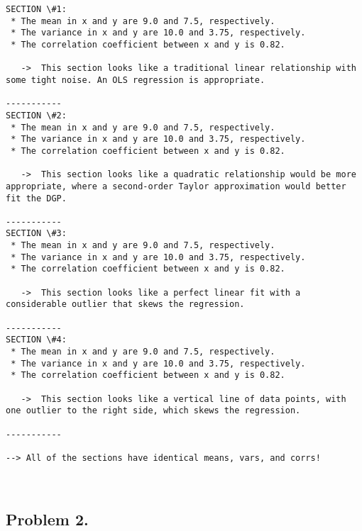 \documentclass[11pt]{article}
\begin{document}
    \begin{Verbatim}[commandchars=\\\{\}]
SECTION \#1:
 * The mean in x and y are 9.0 and 7.5, respectively.
 * The variance in x and y are 10.0 and 3.75, respectively.
 * The correlation coefficient between x and y is 0.82.

   ->  This section looks like a traditional linear relationship with some tight noise. An OLS regression is appropriate. 

-----------
SECTION \#2:
 * The mean in x and y are 9.0 and 7.5, respectively.
 * The variance in x and y are 10.0 and 3.75, respectively.
 * The correlation coefficient between x and y is 0.82.

   ->  This section looks like a quadratic relationship would be more appropriate, where a second-order Taylor approximation would better fit the DGP. 

-----------
SECTION \#3:
 * The mean in x and y are 9.0 and 7.5, respectively.
 * The variance in x and y are 10.0 and 3.75, respectively.
 * The correlation coefficient between x and y is 0.82.

   ->  This section looks like a perfect linear fit with a considerable outlier that skews the regression. 

-----------
SECTION \#4:
 * The mean in x and y are 9.0 and 7.5, respectively.
 * The variance in x and y are 10.0 and 3.75, respectively.
 * The correlation coefficient between x and y is 0.82.

   ->  This section looks like a vertical line of data points, with one outlier to the right side, which skews the regression. 

-----------

--> All of the sections have identical means, vars, and corrs!

    \end{Verbatim}

    \begin{center}
    \end{center}
    { \hspace*{\fill} \\}
    
    \subsection*{Problem 2.}\label{problem-2.}
\end{document}
